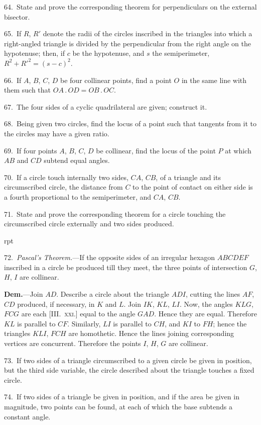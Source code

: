 \documentclass[oneside]{book}
\newcommand\imgflow[3]{
\setcounter{wrapwidth}{#1}
\begin{wrapfigure}[#2]{r}{\value{wrapwidth}pt}
\begin{center}
\vspace{-0.3in}
\end{center}
\end{wrapfigure}
}
\begin{document}
\begin{footnotesize}
64.~State and prove the corresponding theorem for perpendiculars
on the external bisector.

65.~If $R$, $R'$ denote the radii of the circles inscribed in the
triangles into which a right-angled triangle is divided by the perpendicular
from the right angle on the hypotenuse; then, if $c$ be
the hypotenuse, and $s$ the semiperimeter, $R^{2} + R'^{2} = (s-c)^{2}$.

66.~If $A$, $B$, $C$, $D$ be four collinear points, find a point $O$ in
the same line with them such that $OA\,.\,OD = OB\,.\,OC$.

67.~The four sides of a cyclic quadrilateral are given; construct
it.

68.~Being given two circles, find the locus of a point such
that tangents from it to the circles may have a given ratio.

69.~If four points $A$, $B$, $C$, $D$ be collinear, find the locus of the
point $P$ at which $AB$ and $CD$ subtend equal angles.

70.~If a circle touch internally two sides, $CA$, $CB$, of a triangle
and its circumscribed circle, the distance from $C$ to the point of
contact on either side is a fourth proportional to the semiperimeter,
and $CA$, $CB$.

71.~State and prove the corresponding theorem for a circle
touching the circumscribed circle externally and two sides produced.

\imgflow{170}{28}{f214}

72.~\emph{Pascal's Theorem.}---If the opposite sides of an irregular
hexagon $ABCDEF$ inscribed in a circle be produced till they
meet, the three points of intersection $G$, $H$, $I$ are collinear.

\textbf{Dem.}---Join $AD$. Describe a circle about the triangle $ADI$,
cutting the lines $AF$, $CD$ produced, if necessary, in $K$ and $L$.
Join $IK$, $KL$, $LI$. Now,
the angles $KLG$, $FCG$ are
each [III\@.~\textsc{xxi.}] equal to
the angle $GAD$. Hence they
are equal. Therefore $KL$ is
parallel to $CF$. Similarly,
$LI$ is parallel to $CH$, and
$KI$ to $FH$; hence the triangles
$KLI$, $FCH$ are homothetic.
Hence the lines
joining corresponding vertices
are concurrent. Therefore
the points $I$, $H$, $G$ are
collinear.

73.~If two sides of a triangle
circumscribed to a
given circle be given in
position, but the third side
variable, the circle described
about the triangle touches a
fixed circle.

74.~If two sides of a triangle
be given in position,
and if the area be given in
magnitude, two points can be found, at each of which the base
subtends a constant angle.


\end{footnotesize}
\end{document}

